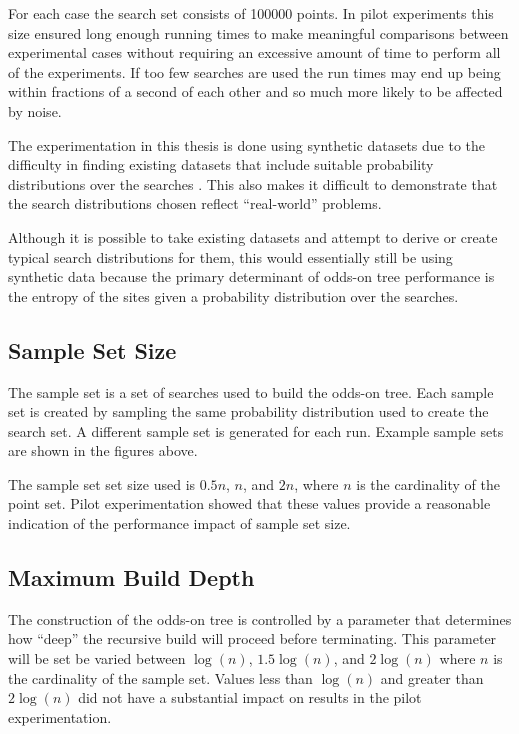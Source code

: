 \documentclass[mcs]{scsthesis}
\begin{document}
For each case the search set consists of 100000 points. In pilot experiments
this size ensured long enough running times to make meaningful comparisons
between experimental cases without requiring an excessive amount of time to
perform all of the experiments. If too few searches are used the run times may
end up being within fractions of a second of each other and so much more likely
to be affected by noise.

The experimentation in this thesis is done using synthetic datasets due to the
difficulty in finding existing datasets that include suitable probability
distributions over the searches . This also makes it difficult to demonstrate
that the search distributions chosen reflect ``real-world'' problems.

Although it is possible to take existing datasets and attempt to derive or
create typical search distributions for them, this would essentially still be
using synthetic data because the primary determinant of odds-on tree performance
is the entropy of the sites given a probability distribution over the searches.

\subsection{Sample Set Size}

The sample set is a set of searches used to build the odds-on tree. Each sample
set is created by sampling the same probability distribution used to create the
search set. A different sample set is generated for each run. Example sample
sets are shown in the figures above.

The sample set set size used is $0.5n$, $n$, and $2n$, where $n$ is the
cardinality of the point set. Pilot experimentation showed that these values
provide a reasonable indication of the performance impact of sample set size. 

\subsection{Maximum Build Depth}

The construction of the odds-on tree is controlled by a parameter that 
determines how ``deep'' the recursive build will proceed before terminating.
This parameter will be set be varied between $\log(n)$, $1.5\log(n)$, and
$2\log(n)$ where $n$ is the cardinality of the sample set. Values less than
$\log(n)$ and greater than $2\log(n)$ did not have a substantial impact on
results in the pilot experimentation. 
\end{document}
